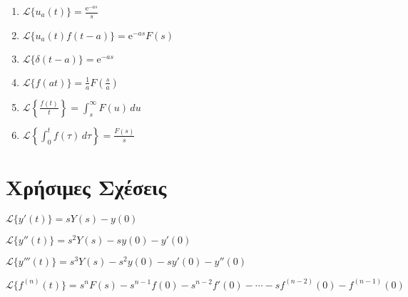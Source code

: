 {\begin{enumerate}
        \item $ \mathcal{L}\{u_{a}(t)\} = \frac{\mathrm{e}^{-as}}{s}$
        \item $ \mathcal{L}\{u_{a}(t)f(t-a)\} = \mathrm{e}^{-as}F(s)$
        \item $ \mathcal{L}\{\delta(t-a)\} = \mathrm{e}^{-as} $
        \item $ \mathcal{L}\{f(at)\} = \frac{1}{a} F\left(\frac{s}{a}\right) $
        \item $ \mathcal{L}\left\{\frac{f(t)}{t} \right\} = \int\nolimits _{s}^{\infty} 
            F(u) \,{du} $
        \item $ \mathcal{L}\left\{\int\nolimits _{0}^{t} f(\tau) \,{d\tau}\right\} = 
            \frac{F(s)}{s} $
    \end{enumerate}
}

\section*{Χρήσιμες Σχέσεις}
\centering
\begin{myitemize}
    \item $ \mathcal{L}\{y'(t)\} = sY(s) - y(0) $
    \item $ \mathcal{L}\{y''(t)\} = s^{2}Y(s) - sy(0) - y'(0) $
    \item $ \mathcal{L}\{y'''(t)\} = s^{3}Y(s) - s^{2}y(0) - sy'(0) - y''(0) $
    \item $ \mathcal{L}\{f^{(n)}(t)\} = s^{n} F(s) - s^{n-1}f(0) - s^{n-2}f'(0) - 
        \cdots - sf^{(n-2)}(0)- f^{(n-1)}(0) $
\end{myitemize}



